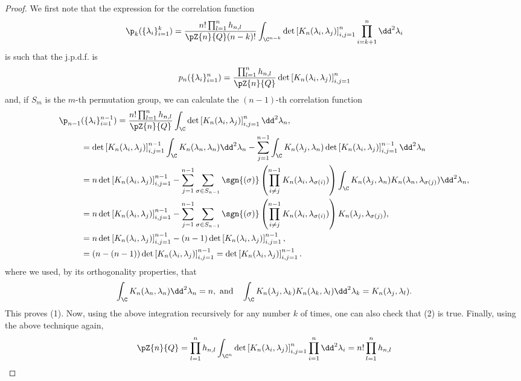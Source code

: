 \begin{proof}
	We first note that the expression for the correlation function
	\begin{equation}
		\p_k(\{\lambda_i\}_{i=1}^k) = \frac{n! \prod_{l=1}^n h_{n,l}}{\pZ{n}{Q} (n-k)!}  \int_{\C^{n-k}} \det\left[ K_n(\lambda_i, \lambda_j) \right]_{i,j=1}^{n} \prod_{i=k+1}^{n} \dd^2 \lambda_i
	\end{equation}
	is such that the j.p.d.f. is
	\begin{equation}
		p_n(\{\lambda_i\}_{i=1}^n) = \frac{\prod_{l=1}^n h_{n,l}}{\pZ{n}{Q}} \det\left[ K_n(\lambda_i, \lambda_j) \right]_{i,j=1}^{n}
	\end{equation}
	and, if $S_m$ is the $m$-th permutation group, we can calculate the $(n-1)$-th correlation function 
	\begin{align}
		\p_{n-1} & (\{\lambda_i\}_{i=1}^{n-1}) = \frac{n! \prod_{l=1}^n h_{n,l}}{\pZ{n}{Q}} \int_{\C} \det\left[ K_n(\lambda_i, \lambda_j) \right]_{i,j=1}^{n} \dd^2 \lambda_n, \\
		&= \det\left[ K_n(\lambda_i, \lambda_j) \right]_{i,j=1}^{n-1} \int_{\C} K_n(\lambda_n, \lambda_n) \dd^2 \lambda_n - \sum_{j=1}^{n-1}  \int_{\C} K_n(\lambda_j, \lambda_n)  \det\left[ K_n(\lambda_i, \lambda_j) \right]_{i,j=1}^{n-1} \dd^2 \lambda_{n} \\
		&= n \det\left[ K_n(\lambda_i, \lambda_j) \right]_{i,j=1}^{n-1} - \sum_{j=1}^{n-1} \sum_{\sigma \in S_{n-1}} \sgn{(\sigma)} \left( \prod_{i\neq j}^{n-1} K_n(\lambda_i, \lambda_{\sigma(i)}) \right) \int_{\C} K_n(\lambda_j, \lambda_n) K_n(\lambda_n, \lambda_{\sigma(j)}) \dd^2 \lambda_{n},\\
		& =  n \det\left[ K_n(\lambda_i, \lambda_j) \right]_{i,j=1}^{n-1} - \sum_{j=1}^{n-1} \sum_{\sigma \in S_{n-1}} \sgn{(\sigma)} \left( \prod_{i\neq j}^{n-1} K_n(\lambda_i, \lambda_{\sigma(i)}) \right) K_n(\lambda_j, \lambda_{\sigma(j)}), \\
		& =  n \det\left[ K_n(\lambda_i, \lambda_j) \right]_{i,j=1}^{n-1} - (n-1)  \det\left[ K_n(\lambda_i, \lambda_j) \right]_{i,j=1}^{n-1}, \\
		& = (n - (n  - 1)) \det\left[ K_n(\lambda_i, \lambda_j) \right]_{i,j=1}^{n-1} =  \det\left[ K_n(\lambda_i, \lambda_j) \right]_{i,j=1}^{n-1}.
	\end{align}
	where we used, by its orthogonality properties, that
	\begin{equation}
		\int_{\C} K_n(\lambda_n, \lambda_n) \dd^2 \lambda_n = n, \ \text{and} \quad \int_{\C} K_n(\lambda_j, \lambda_k) K_n(\lambda_k, \lambda_{l}) \dd^2 \lambda_{k} = K_n(\lambda_j, \lambda_l).
	\end{equation}
	This proves (1). Now, using the above integration recursively for any number $k$ of times, one can also check that (2) is true. Finally, using the above technique again,
	\begin{equation}
		\pZ{n}{Q} = \prod_{l=1}^n h_{n,l}  \int_{\C^n} \det\left[ K_n(\lambda_i, \lambda_j) \right]_{i,j=1}^{n} \prod_{i=1}^{n} \dd^2 \lambda_i = n! \prod_{l=1}^n h_{n,l}
	\end{equation}
\end{proof}
 
